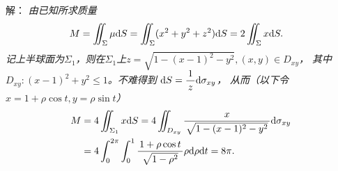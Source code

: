 \begin{frame}
	\linespread{1.5}
	
	\small 解：\it
	由已知所求质量
	\begin{align*}
		M&=\iint_{\Sigma}\mu\mathrm{d} S=\iint_{\Sigma}(x^2+y^2+z^2)\mathrm{d} S
		=2\iint_{\Sigma}x\mathrm{d} S.
	\end{align*}
	记上半球面为$\Sigma_1$，则在$\Sigma_1$上$z=\sqrt{1-(x-1)^2-y^2},(x,y)\in D_{xy}$，
	其中$D_{xy}:(x-1)^2+y^2\leq 1$。不难得到
	$\mathrm{d} S=\displaystyle\frac{\,{1}\,}{\,{z}\,}\mathrm{d}\sigma_{xy}$，
	从而（以下令$x=1+\rho\cos t,y=\rho\sin t$）
	\begin{align*}
		M&=4\iint_{\Sigma_1}x\mathrm{d} S
		=4\iint_{D_{xy}}\displaystyle\frac{\,{x}\,}{\,{\sqrt{1-(x-1)^2-y^2}}\,}\mathrm{d}\sigma_{xy}\\
		&=4\displaystyle\int_0^{2\pi}\displaystyle\int_0^1\displaystyle\frac{\,{1+\rho\cos t}\,}{\,{\sqrt{1-\rho^2}}\,}\rho\mathrm{d}\rho\mathrm{d} t
		=8\pi.
	\end{align*}
	\fin
\end{frame}


% 	
% 	
